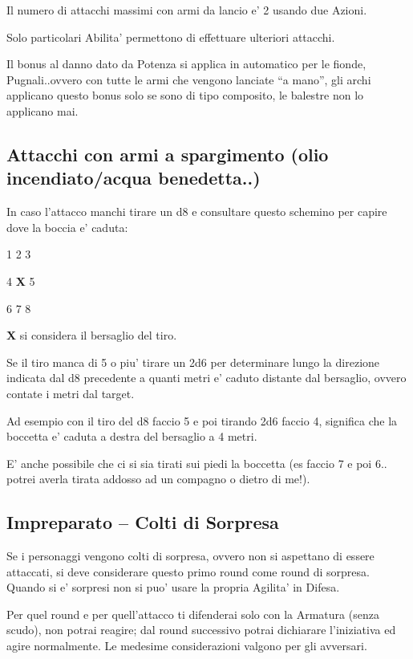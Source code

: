 \documentclass[a4paper,11pt,twoside,openany]{dndbook}
\begin{document}
Il numero di attacchi massimi con armi da lancio e' 2 usando due Azioni.

Solo particolari Abilita' permettono di effettuare ulteriori attacchi.

Il bonus al danno dato da Potenza si applica in automatico per le fionde, Pugnali..ovvero con tutte le armi che vengono lanciate ``a mano'', gli archi applicano questo bonus solo se sono di tipo composito, le balestre non lo applicano mai.

\subsection{Attacchi con armi a spargimento (olio incendiato/acqua benedetta..)}

In caso l'attacco manchi tirare un d8 e consultare questo schemino per capire dove la boccia e' caduta:

1 2 3

4 \textbf{X} 5

6 7 8

\textbf{X} si considera il bersaglio del tiro.

Se il tiro manca di 5 o piu' tirare un 2d6 per determinare lungo la direzione indicata dal d8 precedente a quanti metri e' caduto distante dal bersaglio, ovvero contate i metri dal target.

Ad esempio con il tiro del d8 faccio 5 e poi tirando 2d6 faccio 4, significa che la boccetta e' caduta a destra del bersaglio a 4 metri.

E' anche possibile che ci si sia tirati sui piedi la boccetta (es faccio 7 e poi 6.. potrei averla tirata addosso ad un compagno o dietro di me!).

\subsection{Impreparato -- Colti di Sorpresa}

Se i personaggi vengono colti di sorpresa, ovvero non si aspettano di essere attaccati, si deve considerare questo primo round come round di sorpresa. Quando si e' sorpresi non si puo' usare la propria Agilita' in Difesa.

Per quel round e per quell'attacco ti difenderai solo con la Armatura (senza scudo), non potrai reagire; dal round successivo potrai dichiarare l'iniziativa ed agire normalmente. Le medesime considerazioni valgono per gli avversari.
\end{document}
